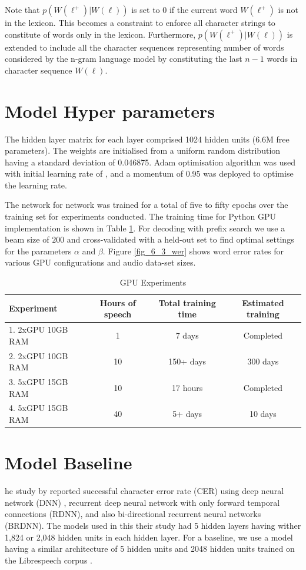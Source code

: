 Note that $p(W(\ell^+)|W(\ell))$ is set to $0$ if the current word $W(\ell^+)$ is not in the lexicon. This becomes a constraint to enforce all character strings to constitute of words only in the lexicon.  Furthermore,  $p(W(\ell^+)|W(\ell))$ is extended to include all the character sequences representing number of words considered by the n-gram language model by constituting the last $n-1$ words in character sequence $W(\ell)$.

\section{Model Hyper parameters}
The hidden layer matrix for each layer comprised 1024 hidden units (6.6M free parameters).  The weights are initialised from a uniform random distribution having a standard deviation of 0.046875.  Adam optimisation algorithm \citep{kingma2014adam} was used with initial learning rate of , and a momentum of 0.95 was deployed to optimise the learning rate.

The network for network was trained for a total of five to fifty epochs over the training set for experiments conducted. The training time for Python GPU implementation is shown in Table \ref{tab_c6_01_training}.  For decoding with prefix search we use a beam size of $200$ and cross-validated with a held-out set to find optimal settings for the parameters $\alpha$ and $\beta$. Figure \ref{fig_6_3_wer} shows word error rates for various GPU configurations and audio data-set sizes.

\begin{table}
  \caption{GPU Experiments}
  \label{tab_c6_01_training}
\begin{tabular}{lccc}
\toprule
Experiment & Hours of speech & Total training time & Estimated training\\
\midrule
1. 2xGPU 10GB RAM & 1 & 7 days & Completed\\
2. 2xGPU 10GB RAM & 10 & 150+ days & 300 days\\
3. 5xGPU 15GB RAM & 10 & 17 hours & Completed\\
4. 5xGPU 15GB RAM & 40 & 5+ days & 10 days\\
\bottomrule
\end{tabular}
\end{table}

\section{Model Baseline}
he study by \cite{hannun2014first} reported successful character error rate (CER)  using deep neural network (DNN) , recurrent deep neural network with only forward temporal connections (RDNN), and also bi-directional recurrent neural networks (BRDNN). The models used in this their study had 5 hidden layers having wither 1,824 or 2,048 hidden units in each hidden layer.  For a baseline, we use a model having a similar architecture of 5 hidden units and 2048 hidden units trained on the Librespeech corpus \citep{panayotov2015librispeech, mozilla/deepspeech_2019}. 


